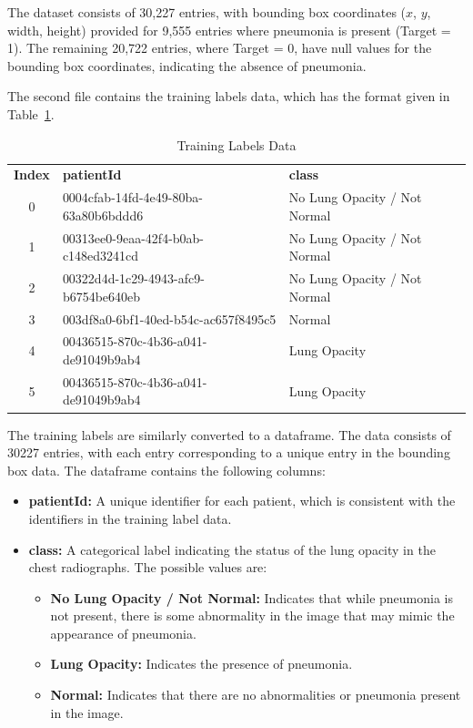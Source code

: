 The dataset consists of 30,227 entries, with bounding box coordinates ($x$, $y$, width, height) provided for 9,555 entries where pneumonia is present (Target = 1). The remaining 20,722 entries, where Target = 0, have null values for the bounding box coordinates, indicating the absence of pneumonia.

The second file contains the training labels data, which has the format given in Table~\ref{tab:cha-2 table2}.

\begin{table}[h!]
    \centering
    \caption{Training Labels Data}
    \label{tab:cha-2 table2}
    \begin{tabular}{c|l|l}
        \rowcolor{gray!20}
        \textbf{Index} & \textbf{patientId}                   & \textbf{class}               \\
        0              & 0004cfab-14fd-4e49-80ba-63a80b6bddd6 & No Lung Opacity / Not Normal \\
        1              & 00313ee0-9eaa-42f4-b0ab-c148ed3241cd & No Lung Opacity / Not Normal \\
        2              & 00322d4d-1c29-4943-afc9-b6754be640eb & No Lung Opacity / Not Normal \\
        3              & 003df8a0-6bf1-40ed-b54c-ac657f8495c5 & Normal                       \\
        4              & 00436515-870c-4b36-a041-de91049b9ab4 & Lung Opacity                 \\
        5              & 00436515-870c-4b36-a041-de91049b9ab4 & Lung Opacity                 \\
    \end{tabular}
\end{table}


The training labels are similarly converted to a dataframe. The data consists of 30227 entries, with each entry corresponding to a unique entry in the bounding box data. The dataframe contains the following columns:

\begin{itemize}
    \item \textbf{patientId:} A unique identifier for each patient, which is consistent with the identifiers in the training label data.
    \item \textbf{class:} A categorical label indicating the status of the lung opacity in the chest radiographs. The possible values are:
          \begin{itemize}
              \item \textbf{No Lung Opacity / Not Normal:} Indicates that while pneumonia is not present, there is some abnormality in the image that may mimic the appearance of pneumonia.
              \item \textbf{Lung Opacity:} Indicates the presence of pneumonia.
              \item \textbf{Normal:} Indicates that there are no abnormalities or pneumonia present in the image.
          \end{itemize}
\end{itemize}

